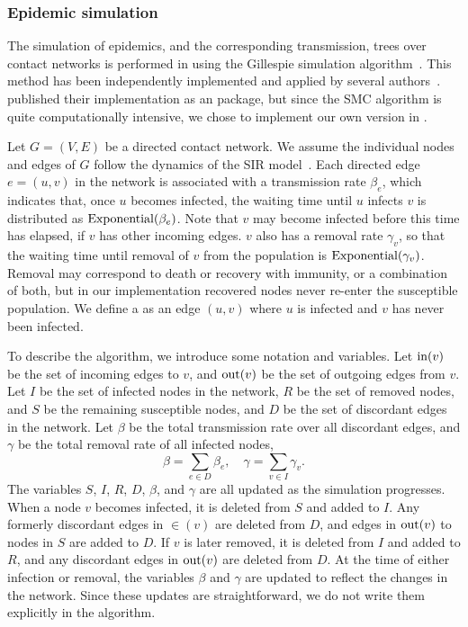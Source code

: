 \subsubsection*{Epidemic simulation}
\label{subsubsec:nettree}

The simulation of epidemics, and the corresponding transmission, trees over
contact networks is performed in  using the Gillespie
simulation algorithm~\autocite{gillespie1976general}. This method has been
independently implemented and applied by several
authors~\autocite[\textit{e.g.}][]{o2011contact, robinson2013dynamics,
leventhal2012inferring, groendyke2011bayesian, villandre2016assessment}.
\textcite{groendyke2011bayesian} published their implementation as an
 package, but since the \gls{SMC} algorithm is quite
computationally intensive, we chose to implement our own version in
.

Let $G = (V, E)$ be a directed contact network. We assume the individual nodes
and edges of $G$ follow the dynamics of the \gls{SIR}
model~\autocite{kermack1927contribution}. Each directed edge $e = (u, v)$ in
the network is associated with a transmission rate $\beta_e$, which indicates
that, once $u$ becomes infected, the waiting time until $u$ infects $v$ is
distributed as $\operatorname{Exponential}(\beta_e)$. Note that $v$ may become infected
before this time has elapsed, if $v$ has other incoming edges. $v$ also has a
removal rate $\gamma_v$, so that the waiting time until removal of $v$ from the
population is $\operatorname{Exponential}(\gamma_v)$. Removal may correspond to death or
recovery with immunity, or a combination of both, but in our implementation
recovered nodes never re-enter the susceptible population. We define a
 as an edge $(u, v)$ where $u$ is infected and $v$ has
never been infected.

To describe the algorithm, we introduce some notation and variables. Let
$\operatorname{in}(v)$ be the set of incoming edges to $v$, and $\operatorname{out}(v)$ be the set of
outgoing edges from $v$. Let $I$ be the set of infected nodes in the network,
$R$ be the set of removed nodes, and $S$ be the remaining susceptible nodes,
and $D$ be the set of discordant edges in the network. Let $\beta$ be the total
transmission rate over all discordant edges, and $\gamma$ be the total removal
rate of all infected nodes,
\[
  \beta = \sum_{e \in D} \beta_e, \quad
  \gamma = \sum_{v \in I} \gamma_v.
\]
The variables $S$, $I$, $R$, $D$, $\beta$, and $\gamma$ are all updated as the
simulation progresses. When a node $v$ becomes infected, it is deleted from $S$
and added to $I$. Any formerly discordant edges in $\in(v)$ are deleted from
$D$, and edges in $\operatorname{out}(v)$ to nodes in $S$ are added to $D$. If $v$ is later
removed, it is deleted from $I$ and added to $R$, and any discordant edges in
$\operatorname{out}(v)$ are deleted from $D$. At the time of either infection or removal, the
variables $\beta$ and $\gamma$ are updated to reflect the changes in the
network. Since these updates are straightforward, we do not write them
explicitly in the algorithm.

